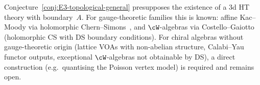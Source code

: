 \begin{remark}
\label{rem:E3-existence-landscape}
Conjecture~\ref{conj:E3-topological-general} presupposes the
existence of a $3$d HT theory with boundary~$A$.
For gauge-theoretic families this is known:
affine Kac--Moody via holomorphic
Chern--Simons~\cite{CL16}, and $\cW$-algebras
via Costello--Gaiotto (holomorphic CS with DS boundary
conditions). For chiral algebras without gauge-theoretic
origin (lattice VOAs with non-abelian structure,
Calabi--Yau functor outputs, exceptional $\cW$-algebras not
obtainable by DS), a direct construction
(e.g.\ quantising the Poisson vertex model) is required and
remains open.
\end{remark}

